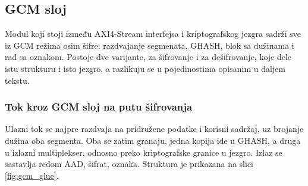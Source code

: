 \subsection{GCM sloj}
\label{subsec:hw_gcm_glue}

Modul koji stoji između AXI4-Stream interfejsa i kriptografskog jezgra sadrži sve iz GCM režima osim šifre: razdvajanje segmenata, GHASH, blok sa dužinama i rad sa oznakom. Postoje dve varijante, za šifrovanje i za dešifrovanje, koje dele istu strukturu i isto jezgro, a razlikuju se u pojedinostima opisanim u daljem tekstu.

\subsubsection{Tok kroz GCM sloj na putu šifrovanja}

Ulazni tok se najpre razdvaja na pridružene podatke i korisni sadržaj, uz brojanje dužina oba segmenta. Oba se zatim granaju, jedna kopija ide u GHASH, a druga u izlazni multiplekser, odnosno preko kriptografske granice u jezgro. Izlaz se sastavlja redom AAD, šifrat, oznaka. Struktura je prikazana na slici \ref{fig:gcm_glue}.

